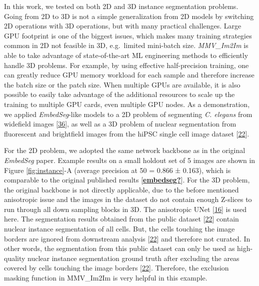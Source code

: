 In this work, we tested on both 2D and 3D instance segmentation problems. Going from 2D to 3D is not a simple generalization from 2D models by switching 2D operations with 3D operations, but with many practical challenges. Large GPU footprint is one of the biggest issues, which makes many training strategies common in 2D not feasible in 3D, e.g.~limited mini-batch size. \emph{MMV\_Im2Im} is able to take advantage of state-of-the-art ML engineering methods to efficiently handle 3D problems. For example, by using effective half-precision training, one can greatly reduce GPU memory workload for each sample and therefore increase the batch size or the patch size. When multiple GPUs are available, it is also possible to easily take advantage of the additional resources to scale up the training to multiple GPU cards, even multiple GPU nodes. As a demonstration, we applied \emph{EmbedSeg}-like models to a 2D problem of segmenting \emph{C. elegans} from widefield images {[}\protect\hyperlink{ref-138foKNOh}{36}{]}, as well as a 3D problem of nuclear segmentation from fluorescent and brightfield images from the hiPSC single cell image dataset {[}\protect\hyperlink{ref-5sGcmDuy}{22}{]}.

For the 2D problem, we adopted the same network backbone as in the original \emph{EmbedSeg} paper. Example results on a small holdout set of 5 images are shown in Figure \ref{fig:instance}-A (average precision at 50 = 0.866 ± 0.163), which is comparable to the original published results {[}\protect\hyperlink{ref-embedseg}{\textbf{embedseg?}}{]}. For the 3D problem, the original backbone is not directly applicable, due to the before mentioned anisotropic issue and the images in the dataset do not contain enough Z-slices to run through all down sampling blocks in 3D. The anisotropic UNet {[}\protect\hyperlink{ref-jM3v1UjQ}{16}{]} is used here. The segmentation results obtained from the public dataset {[}\protect\hyperlink{ref-5sGcmDuy}{22}{]} contain nuclear instance segmentation of all cells. But, the cells touching the image borders are ignored from downstream analysis {[}\protect\hyperlink{ref-5sGcmDuy}{22}{]} and therefore not curated. In other words, the segmentation from this public dataset can only be used as high-quality nuclear instance segmentation ground truth after excluding the areas covered by cells touching the image borders {[}\protect\hyperlink{ref-5sGcmDuy}{22}{]}. Therefore, the exclusion masking function in MMV\_Im2Im is very helpful in this example.

